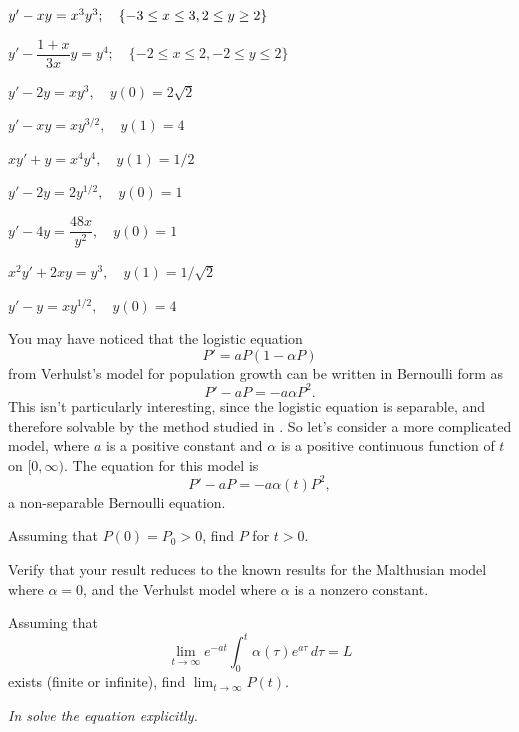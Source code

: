 \begin{exerciselist}
 \item\label{exer:2.4.5}\CGex
$y'-xy=x^3y^3;    \quad \{-3\le x\le 3,\-2\le y\ge 2\}$

\item\label{exer:2.4.6}\CGex
$y'-\dfrac{1+x}{3x}y=y^4;   \quad \{-2\le x\le2,-2\le y \le2\}$


\item\label{exer:2.4.7}$y'-2y=xy^3,\quad y(0)=2\sqrt2$

\item\label{exer:2.4.8}$y'-xy=xy^{3/2},\quad y(1)=4$
\item\label{exer:2.4.9}$xy'+y=x^4y^4,\quad y(1)=1/2$
\item\label{exer:2.4.10}$y'-2y=2y^{1/2},\quad y(0)=1$
\item\label{exer:2.4.11}$y'-4y=\dfrac{48x}{y^2},\quad y(0)=1$




\item\label{exer:2.4.12}\CGex $x^2y'+2xy=y^3,\quad y(1)=1/\sqrt2$
\item\label{exer:2.4.13}\CGex $y'-y=xy^{1/2},\quad y(0)=4$


\item\label{exer:2.4.14}You may have noticed that  the logistic equation
\[
P'=aP(1-\alpha P)
\]
from Verhulst's model for population growth can be written in
Bernoulli form as
\[
P'-aP=-a\alpha P^2.
\]
This isn't particularly interesting, since the logistic equation is
separable, and therefore solvable by the method studied in
. So let's consider a more complicated model,
where
$a$ is a positive constant and $\alpha$ is a positive continuous
function of $t$ on $[0,\infty)$. The equation for this model is
\[
P'-aP=-a\alpha(t) P^2,
\]
a non-separable Bernoulli equation.
\begin{alist}
\item %
Assuming that $P(0)=P_0>0$, find $P$ for $t>0$. 
\item %
Verify that your result reduces to the known results
for the Malthusian model where  $\alpha=0$, and the Verhulst model
where $\alpha$ is a nonzero constant.
\item %
Assuming that
\[
\lim_{t\to\infty}e^{-at}\int_0^t\alpha(\tau)e^{a\tau}\,d\tau=L
\]
exists (finite or infinite), find $\lim_{t\to\infty}P(t)$.
\end{alist}
\end{exerciselist}
%
\textsl{In  solve
the equation explicitly.}

